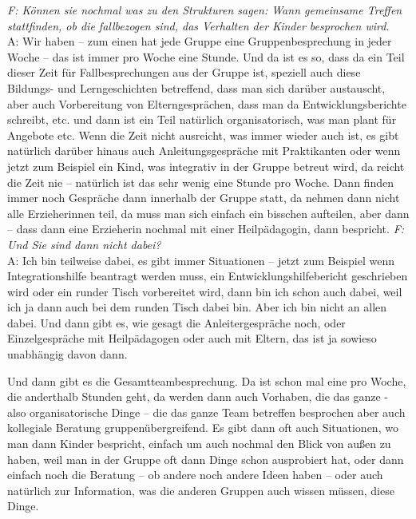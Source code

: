 \begin{linenumbers*}
\emph{F: Können sie nochmal was zu den Strukturen sagen: Wann gemeinsame Treffen stattfinden, ob die fallbezogen sind, das Verhalten der Kinder besprochen wird.}\\
A: Wir haben – zum einen hat jede Gruppe eine Gruppenbesprechung in jeder Woche – das ist immer pro Woche eine Stunde. Und da ist es so, dass da ein Teil dieser Zeit für Fallbesprechungen aus der Gruppe ist, speziell auch diese Bildungs- und Lerngeschichten betreffend, dass man sich darüber austauscht, aber auch Vorbereitung von Elterngesprächen, dass man da Entwicklungsberichte schreibt, etc. und dann ist ein Teil natürlich organisatorisch, was man plant für Angebote etc. Wenn die Zeit nicht ausreicht, was immer wieder auch ist, es gibt natürlich darüber hinaus auch Anleitungsgespräche mit Praktikanten oder wenn jetzt zum Beispiel ein Kind, was integrativ in der Gruppe betreut wird, da reicht die Zeit nie – natürlich ist das sehr wenig eine Stunde pro Woche. Dann finden immer noch Gespräche dann innerhalb der Gruppe statt, da nehmen dann nicht alle Erzieherinnen teil, da muss man sich einfach ein bisschen aufteilen, aber dann – dass  dann eine Erzieherin nochmal mit einer Heilpädagogin, dann bespricht.
\emph{F: Und Sie sind dann nicht dabei?}\\
A: Ich bin teilweise dabei, es gibt immer Situationen – jetzt zum Beispiel wenn Integrationshilfe beantragt werden muss, ein Entwicklungshilfebericht geschrieben wird oder ein runder Tisch vorbereitet wird, dann bin ich schon auch dabei, weil ich ja dann auch bei dem runden Tisch dabei bin. Aber ich bin nicht an allen dabei. Und dann gibt es, wie gesagt die Anleitergespräche noch, oder Einzelgespräche mit Heilpädagogen oder auch mit Eltern, das ist ja sowieso unabhängig davon dann.  

Und dann gibt es die Gesamtteambesprechung. Da ist schon mal eine pro Woche, die anderthalb Stunden geht, da werden dann auch Vorhaben, die das ganze - also organisatorische Dinge – die das ganze Team betreffen besprochen aber auch kollegiale Beratung gruppenübergreifend. Es gibt dann oft auch Situationen, wo man dann Kinder bespricht, einfach um auch nochmal den Blick von außen zu haben, weil man in der Gruppe oft dann Dinge schon ausprobiert hat, oder dann einfach noch die Beratung – ob andere noch andere Ideen haben – oder auch natürlich zur Information, was die anderen Gruppen auch wissen müssen, diese Dinge.


\end{linenumbers*}
